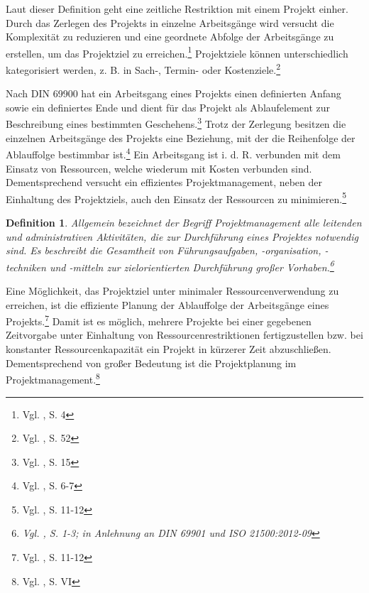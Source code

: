 \documentclass[a4paper,12pt,parskip,bibtotoc,liststotoc]{article}
\newtheorem{mydef}{Definition}
\begin{document}
Laut dieser Definition geht eine zeitliche Restriktion mit einem Projekt einher. Durch das Zerlegen des Projekts in einzelne Arbeitsgänge wird versucht die Komplexität zu reduzieren und eine geordnete Abfolge der Arbeitsgänge zu erstellen, um das Projektziel zu erreichen.\footnote{Vgl. \cite{zimmermann2006projektplanung}, S. 4} Projektziele können unterschiedlich kategorisiert werden, z. B. in Sach-, Termin- oder Kostenziele.\footnote{Vgl. \cite{felkai2011analysieren}, S. 52}

Nach DIN 69900 hat ein Arbeitsgang eines Projekts einen definierten Anfang sowie ein definiertes Ende und dient für das Projekt als Ablaufelement zur Beschreibung eines bestimmten Geschehens.\footnote{Vgl. \cite{69900D}, S. 15} Trotz der Zerlegung besitzen die einzelnen Arbeitsgänge des Projekts eine Beziehung, mit der die Reihenfolge der Ablauffolge bestimmbar ist.\footnote{Vgl. \cite{kellenbrink2014einfuhrung}, S. 6-7} %
Ein Arbeitsgang ist i. d. R. verbunden mit dem Einsatz von Ressourcen, welche wiederum mit Kosten verbunden sind. Dementsprechend versucht ein effizientes Projektmanagement, neben der Einhaltung des Projektziels, auch den Einsatz der Ressourcen zu minimieren.\footnote{Vgl. \cite{bartels2009projektplanung}, S. 11-12}

\begin{mydef}
\glqq Allgemein bezeichnet der Begriff Projektmanagement alle leitenden und administrativen Aktivitäten, die zur Durchführung eines Projektes notwendig sind. Es beschreibt die Gesamtheit von Führungsaufgaben, -organi\-sation, -techniken und -mitteln zur zielorientierten Durchführung großer Vorhaben.\grqq\footnote{Vgl. \cite{hering2014projektmanagement}, S. 1-3; in Anlehnung an DIN 69901 und ISO 21500:2012-09}
\end{mydef}

Eine Möglichkeit, das Projektziel unter minimaler Ressourcenverwendung zu erreichen, ist die effiziente Planung der Ablauffolge der Arbeitsgänge eines Projekts.\footnote{Vgl. \cite{bartels2009projektplanung}, S. 11-12} Damit ist es möglich, mehrere Projekte bei einer gegebenen Zeitvorgabe unter Einhaltung von Ressourcenrestriktionen fertigzustellen bzw. bei konstanter Ressourcenkapazität ein Projekt in kürzerer Zeit abzuschließen. Dementsprechend von großer Bedeutung ist die Projektplanung im Projektmanagement.\footnote{Vgl. \cite{zimmermann2006projektplanung}, S. VI\label{zum}}%
\end{document}
